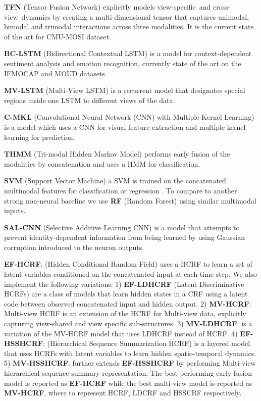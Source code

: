 \documentclass[letterpaper]{article} \usepackage{aaai18}  \usepackage{times}  \usepackage{helvet}  \usepackage{courier}  \usepackage{url}  \usepackage{graphicx}  \usepackage{multirow}
\newcommand{\intra}{view-specific}
\newcommand{\inter}{cross-view}
\begin{document}
\textbf{TFN} (Tensor Fusion Network) \cite{tensoremnlp17} explicitly models \intra \ and \inter \ dynamics by creating a multi-dimensional tensor that captures unimodal, bimodal and trimodal interactions across three modalities. It is the current state of the art for CMU-MOSI dataset.

\textbf{BC-LSTM} (Bidirectional Contextual LSTM) \cite{contextmultimodalacl2017} is a model for context-dependent sentiment analysis and emotion recognition, currently state of the art on the IEMOCAP and MOUD datasets.

\textbf{MV-LSTM} (Multi-View LSTM) \cite{rajagopalan2016extending} is a recurrent model that designates special regions inside one LSTM to different views of the data. 

\textbf{C-MKL} (Convolutional Neural Network (CNN) with Multiple Kernel Learning) \cite{DBLP:conf/emnlp/PoriaCG15} is a model which uses a CNN for visual feature extraction and multiple kernel learning for prediction.

\textbf{THMM} (Tri-modal Hidden Markov Model) \cite{morency2011towards} performs early fusion of the modalities by concatenation and uses a HMM for classification.

\textbf{SVM} (Support Vector Machine) \cite{Cortes:1995:SN:218919.218929} a SVM is trained on the concatenated multimodal features for classification or regression \cite{zadeh2016multimodal,perez-rosas_utterance-level_2013,Park:2014:CAP:2663204.2663260}. To compare to another strong non-neural baseline we use \textbf{RF} (Random Forest) \cite{Breiman:2001:RF:570181.570182} using similar multimodal inputs.

\textbf{SAL-CNN} (Selective Additive Learning CNN) \cite{wang2016select} is a model that attempts to prevent identity-dependent information from being learned by using Gaussian corruption introduced to the neuron outputs. 

\textbf{EF-HCRF}: (Hidden Conditional Random Field) \cite{Quattoni:2007:HCR:1313053.1313265} uses a HCRF to learn a set of latent variables conditioned on the concatenated input at each time step. We also implement the following variations: 1) \textbf{EF-LDHCRF} (Latent Discriminative HCRFs) \cite{morency2007latent} are a class of models that learn hidden states in a CRF using a latent code between observed concatenated input and hidden output. 2) \textbf{MV-HCRF}: Multi-view HCRF \cite{song2012multi} is an extension of the HCRF for Multi-view data, explicitly capturing view-shared and view specific sub-structures. 3) \textbf{MV-LDHCRF}: is a variation of the MV-HCRF model that uses LDHCRF instead of HCRF. 4) \textbf{EF-HSSHCRF}: (Hierarchical Sequence Summarization HCRF) \cite{song2013action} is a layered model that uses HCRFs with latent variables to learn hidden spatio-temporal dynamics. 5) \textbf{MV-HSSHCRF}: further extends \textbf{EF-HSSHCRF} by performing Multi-view hierarchical sequence summary representation. The best performing early fusion model is reported as \textbf{EF-HCRF} while the best multi-view model is reported as \textbf{MV-HCRF}, where  to represent HCRF, LDCRF and HSSCRF respectively.
\end{document}
